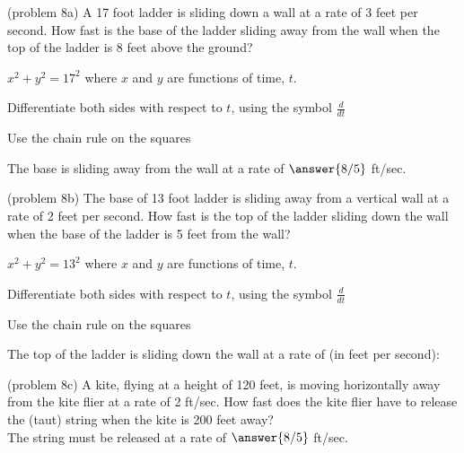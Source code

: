 \documentclass[handout]{ximera}
\begin{document}
\begin{problem}(problem 8a)
A 17 foot ladder is sliding down a wall at a rate of 3 feet per second.  How fast is the base of the 
ladder sliding away from the wall when the top of the ladder is 8 feet above the ground?\\

\begin{hint}
$x^2 + y^2 = 17^2$ where  $x$ and $y$ are functions of time, $t$.
\end{hint}

\begin{hint}
Differentiate both sides with respect to $t$, using the symbol $\frac{d}{dt}$
\end{hint}
\begin{hint}
Use the chain rule on the squares
\end{hint}

The base is sliding away from the wall at a rate of $\answer{8/5}$ ft/sec.
\end{problem}

\begin{problem}(problem 8b)
The base of 13 foot ladder is sliding away from a vertical wall at a rate of 2 
feet per second.  How fast is the top of the ladder sliding down the wall when the base of the 
ladder is 5 feet from the wall?
\begin{hint}
$x^2 + y^2 = 13^2$ where  $x$ and $y$ are functions of time, $t$.
\end{hint}

\begin{hint}
Differentiate both sides with respect to $t$, using the symbol $\frac{d}{dt}$
\end{hint}
\begin{hint}
Use the chain rule on the squares
\end{hint}

The top of the ladder is sliding down the wall at a rate of (in feet per second):
\begin{multipleChoice}
\end{multipleChoice}
\end{problem}


\begin{problem}(problem 8c)
A kite, flying at a height of 120 feet, is moving horizontally away from the kite flier at a rate of 2 ft/sec.  
How fast does the kite flier have to release the (taut) string when the kite is 200 feet away?\\

The string must be released at a rate of $\answer{8/5}$ ft/sec.


\end{problem}
\end{document}
